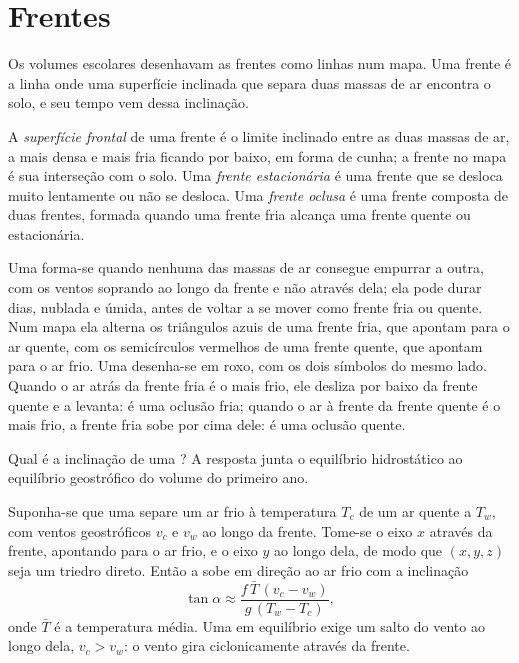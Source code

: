 \section{Frentes}\label{sec:b2:weather-systems:fronts}

Os volumes escolares desenhavam as frentes como linhas num mapa. Uma frente é a linha onde uma
superfície inclinada que separa duas massas de ar encontra o solo, e seu tempo vem dessa inclinação.

\begin{definition}\label{def:b2:weather-systems:fronts}
A \emph{superfície frontal} de uma frente é o limite inclinado entre
as duas massas de ar, a mais densa e mais fria ficando por baixo, em forma de cunha; a frente no mapa é sua
interseção com o solo. Uma \emph{frente estacionária} é uma frente
que se desloca muito lentamente ou não se desloca. Uma \emph{frente oclusa} é
uma frente composta de duas frentes, formada quando uma frente fria alcança uma frente quente ou estacionária.
\end{definition}

Uma  forma-se quando nenhuma das massas de ar consegue empurrar a outra, com os ventos soprando ao longo da
frente e não através dela; ela pode durar dias, nublada e úmida, antes de voltar a se mover como frente fria
ou quente. Num mapa ela alterna os triângulos azuis de uma frente fria, que apontam para o
ar quente, com os semicírculos vermelhos de uma frente quente, que apontam para o ar frio. Uma  desenha-se em roxo, com os dois símbolos do mesmo lado. Quando o ar atrás da frente fria
é o mais frio, ele desliza por baixo da frente quente e a levanta: é uma oclusão fria; quando o ar
à frente da frente quente é o mais frio, a frente fria sobe por cima dele: é uma oclusão quente.

Qual é a inclinação de uma ? A resposta junta o equilíbrio hidrostático ao
equilíbrio geostrófico do volume do primeiro ano.

\begin{proposition}\label{prop:b2:weather-systems:slope}
Suponha-se que uma  separe um ar frio à temperatura $T_c$ de um ar quente a $T_w$, com
ventos geostróficos $v_c$ e $v_w$ ao longo da frente. Tome-se o eixo $x$ através da frente, apontando para o
ar frio, e o eixo $y$ ao longo dela, de modo que $(x, y, z)$ seja um triedro direto. Então a  sobe em direção ao ar frio com a inclinação
\[
  \tan\alpha \approx \frac{f\,\bar T\,(v_c - v_w)}{g\,(T_w - T_c)},
\]
onde $\bar T$ é a temperatura média. Uma  em equilíbrio exige um salto do vento
ao longo dela, $v_c > v_w$: o vento gira ciclonicamente através da frente.
\end{proposition}

